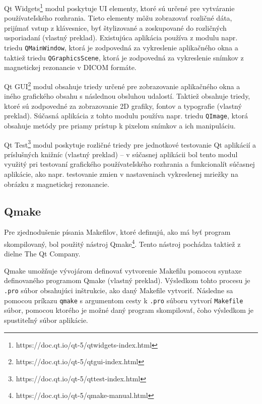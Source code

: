 Qt Widgets\footnote{https://doc.qt.io/qt-5/qtwidgets-index.html} modul poskytuje UI elementy, ktoré sú určené pre vytváranie používateľského rozhrania. Tieto elementy môžu zobrazovať rozličné dáta, prijímať vstup z klávesnice, byť štylizované a zoskupované do rozličných usporiadaní \cite{qtwidgets_description} (vlastný preklad). Existujúca aplikácia používa z modulu napr. triedu \texttt{QMainWindow}, ktorá je zodpovedná za vykreslenie aplikačného okna a taktiež triedu \texttt{QGraphicsScene}, ktorá je zodpovedná za vykreslenie snímkov z magnetickej rezonancie v DICOM formáte.

\clearpage

Qt GUI\footnote{https://doc.qt.io/qt-5/qtgui-index.html} modul obsahuje triedy určené pre zobrazovanie aplikačného okna a iného grafického obsahu s následnou obsluhou udalostí. Taktiež obsahuje triedy, ktoré sú zodpovedné za zobrazovanie 2D grafiky, fontov a typografie \cite{qtgui_description} (vlastný preklad).
Súčasná aplikácia z tohto modulu používa napr. triedu \texttt{QImage}, ktorá obsahuje metódy pre priamy prístup k pixelom snímkov a ich manipuláciu.

Qt Test\footnote{https://doc.qt.io/qt-5/qttest-index.html} modul poskytuje rozličné triedy pre jednotkové testovanie Qt aplikácií a príslušných knižníc \cite{qttest_description} (vlastný preklad) -- v súčasnej aplikácii bol tento modul využitý pri testovaní grafického používateľského rozhrania a funkcionalít súčasnej aplikácie, ako napr. testovanie zmien v nastaveniach vykreslenej mriežky na obrázku z magnetickej rezonancie.

\subsection {Qmake}\label{qmake}
Pre zjednodušenie písania Makefilov, ktoré definujú, ako má byť program skompilovaný, bol použitý nástroj Qmake\footnote{https://doc.qt.io/qt-5/qmake-manual.html}. Tento nástroj pochádza taktiež z dielne The Qt Company.

Qmake umožňuje vývojárom definovať vytvorenie Makefilu pomocou syntaxe definovaného programom Qmake \cite{qmake_description} (vlastný preklad). Výsledkom tohto procesu je \texttt{.pro} súbor obsahujúci inštrukcie, ako daný Makefile vytvoriť. \newline Následne sa pomocou príkazu \texttt{qmake} s argumentom cesty k \texttt{.pro} súboru vytvorí \texttt{Makefile} súbor, pomocou ktorého je možné daný program skompilovať, čoho výsledkom je spustiteľný súbor aplikácie.

